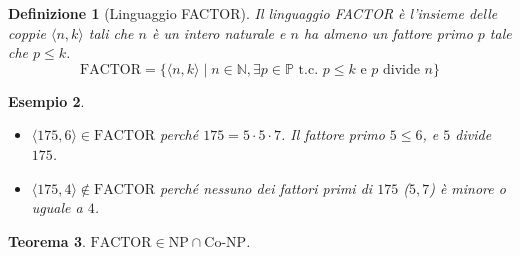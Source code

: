 \documentclass[a4paper, 11pt]{book} %
\newtheorem{theorem}{Teorema}[section]
\newtheorem{definition}[theorem]{Definizione}
\newtheorem{example}[theorem]{Esempio}
\theoremstyle{definition}
\begin{document}
\begin{definition}[Linguaggio FACTOR]
Il linguaggio FACTOR è l'insieme delle coppie $\langle n, k \rangle$ tali che $n$ è un intero naturale e $n$ ha almeno un fattore primo $p$ tale che $p \le k$.
\[
\text{FACTOR} = \{ \langle n, k \rangle \mid n \in \mathbb{N}, \exists p \in \mathbb{P} \text{ t.c. } p \le k \text{ e } p \text{ divide } n \}
\]
\end{definition}

\begin{example}
\begin{itemize}
    \item $\langle 175, 6 \rangle \in \text{FACTOR}$ perché $175 = 5 \cdot 5 \cdot 7$. Il fattore primo $5 \le 6$, e $5$ divide $175$.
    \item $\langle 175, 4 \rangle \notin \text{FACTOR}$ perché nessuno dei fattori primi di $175$ ($5, 7$) è minore o uguale a $4$.
\end{itemize}
\end{example}

\begin{theorem}
$\text{FACTOR} \in \text{NP} \cap \text{Co-NP}$.
\end{theorem}
\end{document}
